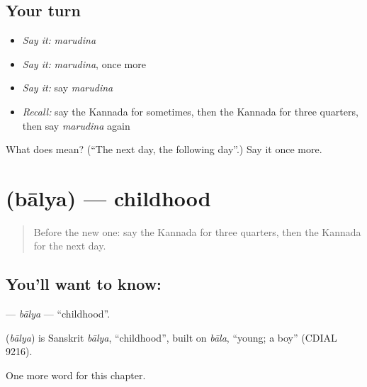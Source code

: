 \subsection*{Your turn}
\begin{itemize}
\raggedright
  \item \emph{Say it:} \emph{marudina}
  \item \emph{Say it:} \emph{marudina}, once more
  \item \emph{Say it:} say \emph{marudina}
  \item \emph{Recall:} say the Kannada for sometimes, then the Kannada for three quarters, then say \emph{marudina} again
\end{itemize}

\begin{tcolorbox}[breakable,colback=teal!4,colframe=teal!35!black,title={Before you move on}]
What does  mean? (\textquotedblleft{}The next day, the following day\textquotedblright{}.) Say it once more.
\end{tcolorbox}
\section[\texorpdfstring{\kn{ಬಾಲ್ಯ} (bālya)}{ಬಾಲ್ಯ (bālya)}]{ (bālya) — childhood}

\label{lesson:KA-C285-balya}



\begin{quote}
Before the new one: say the Kannada for three quarters, then the Kannada for the next day.
\end{quote}

\subsection*{You'll want to know: }
\textbf{} — \emph{bālya} — \textquotedblleft{}childhood\textquotedblright{}.

\begin{cousinweb}
\textbf{} (\emph{bālya}) is Sanskrit \emph{bālya}, \textquotedblleft{}childhood\textquotedblright{}, built on \emph{bāla}, \textquotedblleft{}young; a boy\textquotedblright{} (CDIAL 9216).
\end{cousinweb}

\begin{grammarlens}[title={What you've built}]
One more word for this chapter.
\end{grammarlens}


